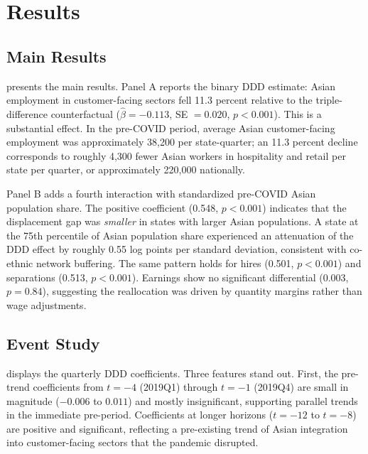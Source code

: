 \documentclass[12pt]{article}
\begin{document}
\section{Results}

\subsection{Main Results}



 presents the main results. Panel A reports the binary DDD estimate: Asian employment in customer-facing sectors fell 11.3 percent relative to the triple-difference counterfactual ($\hat{\beta} = -0.113$, SE $= 0.020$, $p < 0.001$). This is a substantial effect. In the pre-COVID period, average Asian customer-facing employment was approximately 38,200 per state-quarter; an 11.3 percent decline corresponds to roughly 4,300 fewer Asian workers in hospitality and retail per state per quarter, or approximately 220,000 nationally.

Panel B adds a fourth interaction with standardized pre-COVID Asian population share. The positive coefficient (0.548, $p < 0.001$) indicates that the displacement gap was \textit{smaller} in states with larger Asian populations. A state at the 75th percentile of Asian population share experienced an attenuation of the DDD effect by roughly 0.55 log points per standard deviation, consistent with co-ethnic network buffering. The same pattern holds for hires (0.501, $p < 0.001$) and separations (0.513, $p < 0.001$). Earnings show no significant differential (0.003, $p = 0.84$), suggesting the reallocation was driven by quantity margins rather than wage adjustments.

\subsection{Event Study}



 displays the quarterly DDD coefficients. Three features stand out. First, the pre-trend coefficients from $t = -4$ (2019Q1) through $t = -1$ (2019Q4) are small in magnitude ($-0.006$ to $0.011$) and mostly insignificant, supporting parallel trends in the immediate pre-period. Coefficients at longer horizons ($t = -12$ to $t = -8$) are positive and significant, reflecting a pre-existing trend of Asian integration into customer-facing sectors that the pandemic disrupted.
\end{document}
